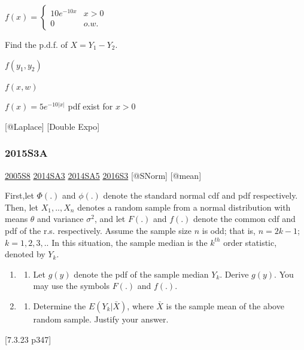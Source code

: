 \documentclass[6pt,Portrait]{article}
\providecommand{\tightlist}{%
  \setlength{\itemsep}{0pt}\setlength{\parskip}{0pt}}
\begin{document}
\(f(x)=\begin{cases}10e^{-10x}& x>0\\0& o.w.\end{cases}\)

Find the p.d.f. of \(X=Y_1-Y_2\).

\(f(y_1,y_2)\)

\(f(x,w)\)

\(f(x)=5e^{-10|x|}\) pdf exist for \(x>0\)

{[}@Laplace{]} {[}Double Expo{]}

\hypertarget{s3a-1}{%
\subsubsection{2015S3A}\label{s3a-1}}

\protect\hyperlink{s8-1}{2005S8} \protect\hyperlink{sa3-2}{2014SA3}
\protect\hyperlink{sa5-1}{2014SA5} \protect\hyperlink{s3-4}{2016S3}
{[}@SNorm{]} {[}@mean{]}

First,let \(\Phi(.)\) and \(\phi(.)\) denote the standard normal cdf and
pdf respectively. Then, let \(X_1,..,X_n\) denotes a random sample from
a normal distribution with means \(\theta\) and variance \(\sigma^2\),
and let \(F(.)\) and \(f(.)\) denote the common cdf and pdf of the r.s.
respectively. Assume the sample size \(n\) is odd; that is, \(n=2k-1\);
\(k=1,2,3,..\) In this situation, the sample median is the \(k^{th}\)
order statistic, denoted by \(Y_k\).

\begin{enumerate}
\def\labelenumi{(\alph{enumi})}
\item
  \begin{enumerate}
  \def\labelenumii{(\arabic{enumii})}
  \setcounter{enumii}{4}
  \tightlist
  \item
    Let \(g(y)\) denote the pdf of the sample median \(Y_k\). Derive
    \(g(y)\). You may use the symbols \(F(.)\) and \(f(.)\).
  \end{enumerate}
\item
  \begin{enumerate}
  \def\labelenumii{(\arabic{enumii})}
  \setcounter{enumii}{4}
  \tightlist
  \item
    Determine the \(E(Y_k|\bar X)\), where \(\bar X\) is the sample mean
    of the above random sample. Justify your answer.
  \end{enumerate}
\end{enumerate}

{[}7.3.23 p347{]}
\end{document}
